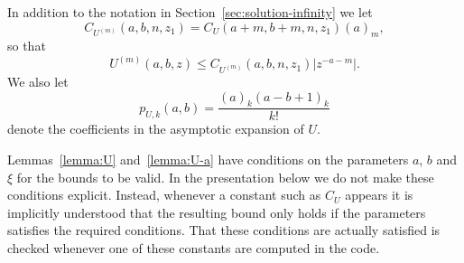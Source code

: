 \documentclass[11pt]{article}
\begin{document}
In addition to the notation in Section~\ref{sec:solution-infinity} we
let
\begin{equation*}
  C_{U^{(m)}}(a, b, n, z_{1}) = C_{U}(a + m, b + m, n, z_{1})(a)_{m},
\end{equation*}
so that
\begin{equation}
  \label{eq:U-dz-bound}
  U^{(m)}(a, b, z) \leq C_{U^{(m)}}(a, b, n, z_{1})|z^{-a - m}|.
\end{equation}
We also let
\begin{equation*}
  p_{U,k}(a, b) = \frac{(a)_{k}(a - b + 1)_{k}}{k!}
\end{equation*}
denote the coefficients in the asymptotic expansion of \(U\).

Lemmas~\ref{lemma:U} and~\ref{lemma:U-a} have conditions on the
parameters \(a\), \(b\) and \(\xi\) for the bounds to be valid. In the
presentation below we do not make these conditions explicit. Instead,
whenever a constant such as \(C_{U}\) appears it is implicitly
understood that the resulting bound only holds if the parameters
satisfies the required conditions. That these conditions are actually
satisfied is checked whenever one of these constants are computed in
the code.
\end{document}
